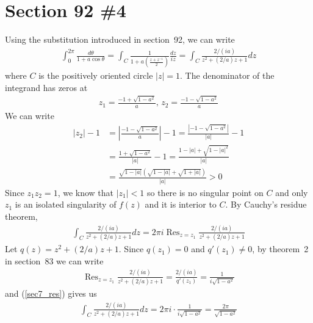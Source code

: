 \documentclass{scrartcl}
\DeclareMathOperator*{\Res}{Res}
\begin{document}
\section{Section 92 \#4}
Using the substitution introduced in section~92, we can write
\begin{align*}
  \int^{2\pi}_0 \frac{d\theta}{1 + a \cos \theta}
  = \int_C \frac{1}{1 + a \left( \frac{z + z^{-1}}{2} \right)} \frac{dz}{iz}
  = \int_C \frac{2 / (ia)}{z^2 + (2 / a)z + 1} dz
\end{align*}
where \(C\) is the positively oriented circle \(|z| = 1\).
The denominator of the integrand has zeros at
\begin{align*}
  z_1 = \frac{-1 + \sqrt{1 - a^2}}{a},\, z_2 = \frac{-1 - \sqrt{1 - a^2}}{a}
\end{align*}
We can write
\begin{align*}
  |z_2| - 1
  &= \left| \frac{-1 - \sqrt{1 - a^2}}{a} \right| - 1
  = \frac{|-1 - \sqrt{1 - a^2}|}{|a|} - 1 \\
  &= \frac{1 + \sqrt{1 - a^2}}{|a|} - 1
  = \frac{1 - |a| + \sqrt{1 - |a|^2}}{|a|} \\
  &= \frac{\sqrt{1 - |a|} (\sqrt{1 - |a|} + \sqrt{1 + |a|})}{|a|}
  > 0
\end{align*}
Since \(z_1 z_2 = 1\), we know that \(|z_1| < 1\) so there is no singular point on \(C\) and only \(z_1\) is an isolated singularity of \(f(z)\) and it is interior to \(C\).
By Cauchy's residue theorem,
\begin{align}\label{sec7_res}
  \int_C \frac{2 / (ia)}{z^2 + (2 / a)z + 1} dz = 2\pi i\Res_{z = z_1} \frac{2 / (ia)}{z^2 + (2 / a) z +1}
\end{align}
Let \(q(z) = z^2 + (2 / a)z + 1\).
Since \(q(z_1) = 0\) and \(q'(z_1) \not = 0\), by theorem~2 in section~83 we can write
\begin{align*}
  \Res_{z = z_1} \frac{2 / (ia)}{z^2 + (2 / a)z + 1}
  = \frac{2 / (ia)}{q'(z_1)}
  = \frac{1}{i\sqrt{1 - a^2}}
\end{align*}
and (\ref{sec7_res}) gives us
\begin{align*}
  \int_C \frac{2 / (ia)}{z^2 + (2 / a)z + 1} dz
  = 2\pi i \cdot \frac{1}{i\sqrt{1 - a^2}}
  = \frac{2\pi}{\sqrt{1 - a^2}}
\end{align*}
\end{document}
